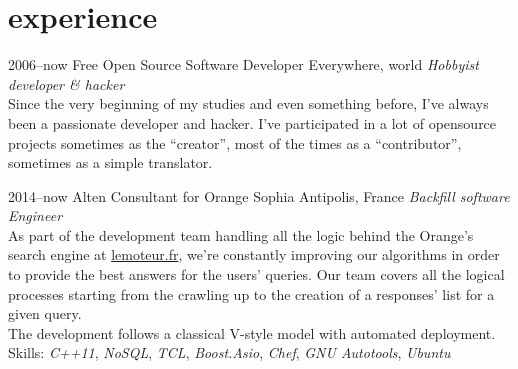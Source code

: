 \documentclass[]{friggeri-cv}
\begin{document}

\section{experience}

\begin{entrylist}
  \entry
      {2006--now}
      {Free Open Source Software Developer}
      {Everywhere, world}
      {\emph{Hobbyist developer \& hacker} \\
        Since the very beginning of my studies and even something before, I've
        always been a passionate developer and hacker.  I've participated in a
        lot of opensource projects sometimes as the ``creator'', most of the
        times as a ``contributor'', sometimes as a simple translator.}
\end{entrylist}

\begin{entrylist}
  \entry
      {2014--now}
      {Alten Consultant for Orange}
      {Sophia Antipolis, France}
      {\emph{Backfill software Engineer} \\
        As part of the development team handling all the logic behind the
        Orange's search engine at \href{http://lemoteur.fr}{lemoteur.fr}, we're
        constantly improving our algorithms in order to provide the best answers
        for the users' queries.  Our team covers all the logical processes
        starting from the crawling up to the creation of a responses' list for a
        given query. \\
        The development follows a classical V-style model with automated
        deployment. \\
        Skills: \emph{C++11}, \emph{NoSQL}, \emph{TCL}, \emph{Boost.Asio},
        \emph{Chef}, \emph{GNU Autotools}, \emph{Ubuntu}
      }
\end{entrylist}
\end{document}
